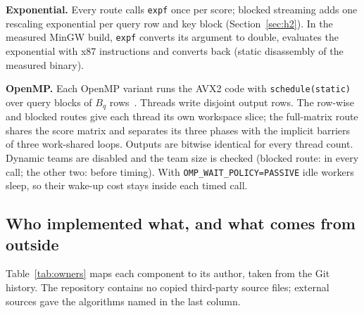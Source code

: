 \documentclass[11pt,a4paper]{article}
\newcommand{\code}[1]{\texttt{#1}}
\newcommand{\Bq}{B_q}
\begin{document}
\textbf{Exponential.} Every route calls \code{expf} once per score; blocked streaming adds one rescaling exponential per query row and key block (Section~\ref{sec:h2}). In the measured MinGW build, \code{expf} converts its argument to double, evaluates the exponential with x87 instructions and converts back (static disassembly of the measured binary).

\textbf{OpenMP.} Each OpenMP variant runs the AVX2 code with \code{schedule(static)} over query blocks of $\Bq$ rows~\cite{openmp52}. Threads write disjoint output rows. The row-wise and blocked routes give each thread its own workspace slice; the full-matrix route shares the score matrix and separates its three phases with the implicit barriers of three work-shared loops. Outputs are bitwise identical for every thread count. Dynamic teams are disabled and the team size is checked (blocked route: in every call; the other two: before timing). With \code{OMP\_WAIT\_POLICY=PASSIVE} idle workers sleep, so their wake-up cost stays inside each timed call.

\subsection{Who implemented what, and what comes from outside}
Table~\ref{tab:owners} maps each component to its author, taken from the Git history. The repository contains no copied third-party source files; external sources gave the algorithms named in the last column.
\end{document}
